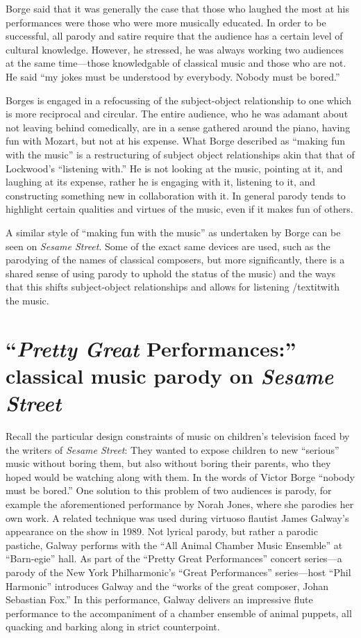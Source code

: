 \documentclass[12pt,letterpaper]{article}
\newcommand{\ses}{\textit{Sesame Street }}
\begin{document}
	Borge said that it was generally the case that those who laughed
	the most at his performances were those who were more musically 
	educated. In order to be successful, all parody and satire require that
	the audience has a certain level of cultural 
	knowledge.\autocite[249]{Garrett} However, he stressed, he was always 
	working two audiences at the same time---those knowledgable of classical
	music and those who are not. He said ``my jokes must be understood by 
	everybody. Nobody must be bored.''\autocite[256]{Garrett} 

 	Borges is engaged in a refocussing of the subject-object 
	relationship to one which is more reciprocal and circular. The entire 
	audience, who he was adamant about not leaving behind comedically, are
	in a sense gathered around the piano, having fun with Mozart, but not at
	his expense. What Borge described as ``making fun with the music'' is a 
	restructuring
	of subject object relationships akin that that of Lockwood's ``listening
	with.'' He is not looking at the music, pointing at it, and laughing at
	its expense, rather he is engaging with it, listening to it, and 
	constructing something new in collaboration with it. In general parody 
	tends to highlight certain qualities and virtues of the music, even if 
	it makes fun of others. 

	A similar style of ``making fun with the music'' as undertaken by 
	Borge can be seen on \textit{Sesame Street}. Some of the exact same 
	devices are used, such as the parodying of the names of classical 
	composers, but more significantly, there is a shared sense of using 
	parody to uphold the status of the music) and the ways that this shifts
	subject-object relationships and allows for listening /textit{with} the
	music.

	\section*{``\textit{Pretty Great} Performances:'' classical music 
	parody on \ses}
	
	Recall the particular design constraints of music on children's
	television faced by the writers of \textit{Sesame Street}: 	
	They wanted to expose children to new ``serious'' music without boring
	them, but also without boring their parents, who they hoped would be 
	watching along with them. In the words of Victor Borge ``nobody must
	be bored.'' One solution to this problem of two audiences is parody,
	for example the aforementioned performance by Norah Jones, where she
	parodies her own work. A related technique was used during virtuoso 
	flautist James Galway's appearance on the show in 1989. Not lyrical 
	parody, but rather a parodic pastiche, Galway performs with the ``All 
	Animal Chamber Music Ensemble'' at ``Barn-egie'' hall. As part of the 
	``Pretty Great Performances'' concert series---a parody of the New York
	Philharmonic's ``Great Performances'' series---host ``Phil Harmonic'' 
	introduces Galway and the ``works of the great composer, Johan Sebastian
	Fox.'' In this performance, Galway delivers an impressive flute 
	performance to the accompaniment of a chamber ensemble of animal 
	puppets, all quacking and barking along in strict 
	counterpoint.\autocite{Galway2}
\end{document}
